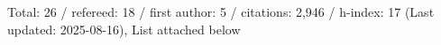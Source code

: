 Total: 26 / refereed: 18 / first author: 5 / citations: 2,946 / h-index: 17 (Last updated: 2025-08-16), List attached below